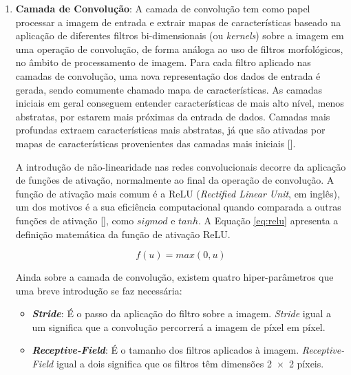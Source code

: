 \begin{enumerate}
    \item \textbf{Camada de Convolução}:
            A camada de convolução tem como papel processar a imagem de entrada e extrair mapas de características baseado na aplicação 
            de diferentes filtros bi-dimensionais (ou \textit{kernels}) sobre a imagem em uma operação de convolução, de forma análoga ao 
            uso de filtros morfológicos, no âmbito de processamento de imagem. Para cada filtro aplicado nas camadas de convolução, uma nova 
            representação dos dados de entrada é gerada, sendo comumente chamado mapa de características. As camadas iniciais em geral 
            conseguem entender características de mais alto nível, menos abstratas, por estarem mais próximas da entrada de dados. Camadas mais 
            profundas extraem características mais abstratas, já que são ativadas por mapas de características provenientes das camadas mais 
            iniciais [].
        
            A introdução de não-linearidade nas redes convolucionais decorre da aplicação de funções de ativação, normalmente ao final da 
            operação de convolução. A função de ativação mais comum é a ReLU (\textit{Rectified Linear Unit}, em inglês), um dos motivos é a 
            sua eficiência computacional quando comparada a outras funções de ativação [], como $sigmod$ e $tanh$. 
            A Equação \ref{eq:relu} apresenta a definição matemática da função de ativação ReLU.
            
            \begin{equation}
                f(u) = max(0,u)
                \label{eq:relu}
            \end{equation}
            
            Ainda sobre a camada de convolução, existem quatro hiper-parâmetros que uma breve introdução se faz necessária:
            \begin{itemize}
                \item \textbf{\textit{Stride}}: É o passo da aplicação do filtro sobre a imagem. \textit{Stride} igual a um significa que a convolução 
                percorrerá a imagem de píxel em píxel.

                \item \textbf{\textit{Receptive-Field}}: É o tamanho dos filtros aplicados à imagem. \textit{Receptive-Field} igual a dois significa 
                que os filtros têm dimensões 2 × 2 píxeis.


\end{itemize}
\end{enumerate}
